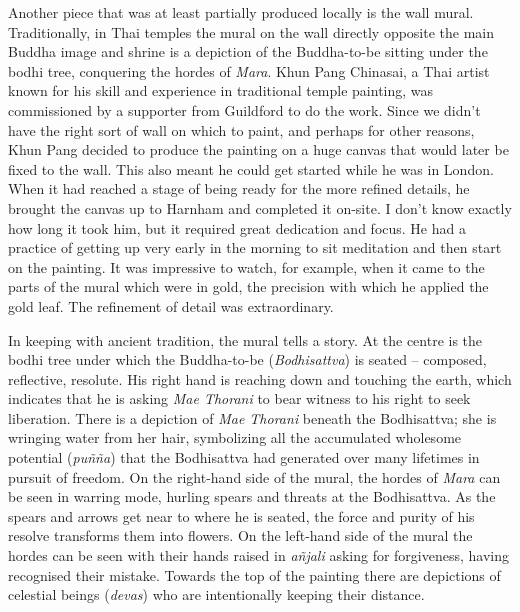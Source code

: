 Another piece that was at least partially produced locally is the wall
mural. Traditionally, in Thai temples the mural on the wall directly
opposite the main Buddha image and shrine is a depiction of the
Buddha-to-be sitting under the bodhi tree, conquering the hordes of
\emph{Mara}. Khun Pang Chinasai, a Thai artist known for his skill and
experience in traditional temple painting, was commissioned by a
supporter from Guildford to do the work. Since we didn't have the right
sort of wall on which to paint, and perhaps for other reasons, Khun Pang
decided to produce the painting on a huge canvas that would later be
fixed to the wall. This also meant he could get started while he was in
London. When it had reached a stage of being ready for the more refined
details, he brought the canvas up to Harnham and completed it on-site. I
don't know exactly how long it took him, but it required great
dedication and focus. He had a practice of getting up very early in the
morning to sit meditation and then start on the painting. It was
impressive to watch, for example, when it came to the parts of the mural
which were in gold, the precision with which he applied the gold leaf.
The refinement of detail was extraordinary.

In keeping with ancient tradition, the mural tells a story. At the
centre is the bodhi tree under which the Buddha-to-be
(\emph{Bodhisattva}) is seated -- composed, reflective, resolute. His
right hand is reaching down and touching the earth, which indicates that
he is asking \emph{Mae Thorani} to bear witness to his right to seek
liberation. There is a depiction of \emph{Mae Thorani} beneath the
Bodhisattva; she is wringing water from her hair, symbolizing all the
accumulated wholesome potential (\emph{puñña}) that the Bodhisattva had
generated over many lifetimes in pursuit of freedom. On the right-hand
side of the mural, the hordes of \emph{Mara} can be seen in warring
mode, hurling spears and threats at the Bodhisattva. As the spears and
arrows get near to where he is seated, the force and purity of his
resolve transforms them into flowers. On the left-hand side of the mural
the hordes can be seen with their hands raised in \emph{añjali} asking
for forgiveness, having recognised their mistake. Towards the top of the
painting there are depictions of celestial beings (\emph{devas}) who are
intentionally keeping their distance.

